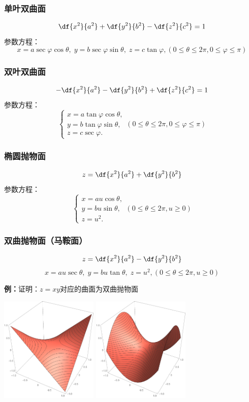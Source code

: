 \subsubsection{单叶双曲面}
$${\df{x^2}{a^2}+\df{y^2}{b^2}-\df{z^2}{c^2}=1}$$
参数方程：
$$x=a\sec\varphi\cos\theta,\;y=b\sec\varphi\sin\theta,\;z=c\tan\varphi,
(0\leq\theta\leq 2\pi,0\leq\varphi\leq\pi)$$

\subsubsection{双叶双曲面}
$${-\df{x^2}{a^2}-\df{y^2}{b^2}+\df{z^2}{c^2}=1}$$
参数方程：
$$\left\{\begin{array}{l}
	x=a\tan\varphi\cos\theta,\\
	y=b\tan\varphi\sin\theta,\\
	z=c\sec\varphi.
\end{array}\right.(0\leq\theta\leq 2\pi,0\leq\varphi\leq\pi)$$

\subsubsection{椭圆抛物面}
$${z=\df{x^2}{a^2}+\df{y^2}{b^2}}$$
参数方程：
$$\left\{\begin{array}{l}
	x=au\cos\theta,\\
	y=bu\sin\theta,\\
	z=u^2.
\end{array}\right.(0\leq\theta\leq 2\pi,u\geq 0)$$

\subsubsection{双曲抛物面（马鞍面）}
$${z=\df{x^2}{a^2}-\df{y^2}{b^2}}$$
$$x=au\sec\theta,\;y=bu\tan\theta,\;z=u^2,
(0\leq\theta\leq 2\pi,u\geq
0)$$

{\bf 例：}证明：$z=xy$对应的曲面为双曲抛物面
\begin{center}
	\includegraphics[width=0.35\textwidth]{./images/ch8/zxy.pdf}\quad
	\includegraphics[width=0.35\textwidth]{./images/ch8/zx2y2.pdf}
\end{center}

